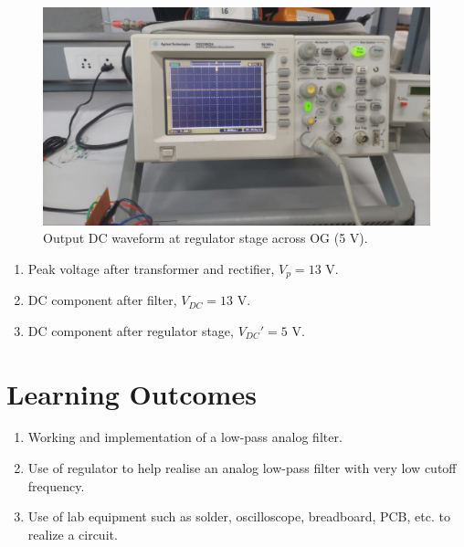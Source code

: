 \documentclass[journal,12pt,twocolumn]{IEEEtran}
\begin{document}
	\begin{figure}[!ht]
		\includegraphics[width=\columnwidth]{figs/final_op.jpg}
		\caption{Output DC waveform at regulator stage across OG (5 V).}
		\label{fig:regulator_dc}
	\end{figure}
	
	
	\begin{enumerate}
		\item Peak voltage after transformer and rectifier, 
		$V_p = 13$ V.
		\item DC component after filter, 
		$V_{DC} = 13$ V.
		\item DC component after regulator stage, $V_{DC}' = 5$ V.
	\end{enumerate}
	
	\section{Learning Outcomes}
	\begin{enumerate}
		\item Working and implementation of a low-pass analog filter.
		\item Use of regulator to help realise an analog low-pass filter with
		very low cutoff frequency.
		\item Use of lab equipment such as solder, oscilloscope, breadboard, PCB, etc.
		to realize a circuit.
	\end{enumerate}
\end{document}
